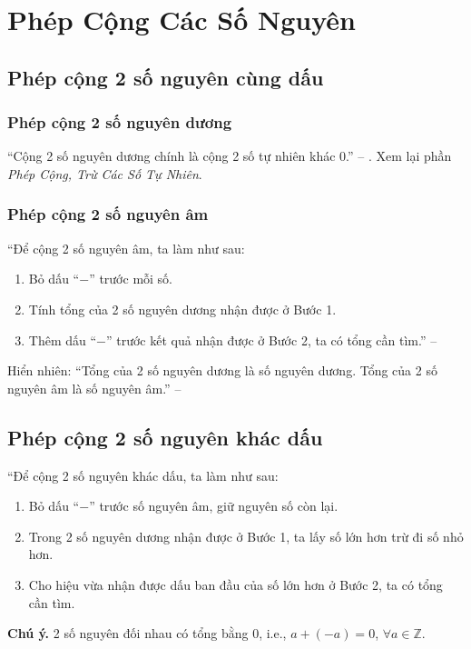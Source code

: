 \documentclass[oneside]{book}
\numberwithin{equation}{section}
\begin{document}

\section{Phép Cộng Các Số Nguyên}

\subsection{Phép cộng 2 số nguyên cùng dấu}

\subsubsection{Phép cộng 2 số nguyên dương}
``Cộng 2 số nguyên dương chính là cộng 2 số tự nhiên khác 0.'' -- \cite[p. 70]{Thai_Anh_Dat_Ha_Loan_Nam_Quang_Toan_6_tap_1}. Xem lại phần \textit{Phép Cộng, Trừ Các Số Tự Nhiên}.

\subsubsection{Phép cộng 2 số nguyên âm}
``Để cộng 2 số nguyên âm, ta làm như sau:
\begin{enumerate}
	\item Bỏ dấu ``$-$'' trước mỗi số.
	\item Tính tổng của 2 số nguyên dương nhận được ở Bước 1.
	\item Thêm dấu ``$-$'' trước kết quả nhận được ở Bước 2, ta có tổng cần tìm.'' -- \cite[p. 71]{Thai_Anh_Dat_Ha_Loan_Nam_Quang_Toan_6_tap_1}
\end{enumerate}
Hiển nhiên: ``Tổng của 2 số nguyên dương là số nguyên dương. Tổng của 2 số nguyên âm là số nguyên âm.'' -- \cite[p. 71]{Thai_Anh_Dat_Ha_Loan_Nam_Quang_Toan_6_tap_1}

\subsection{Phép cộng 2 số nguyên khác dấu}
``Để cộng 2 số nguyên khác dấu, ta làm như sau:
\begin{enumerate}
	\item Bỏ dấu ``$-$'' trước số nguyên âm, giữ nguyên số còn lại.
	\item Trong 2 số nguyên dương nhận được ở Bước 1, ta lấy số lớn hơn trừ đi số nhỏ hơn.
	\item Cho hiệu vừa nhận được dấu ban đầu của số lớn hơn ở Bước 2, ta có tổng cần tìm.
\end{enumerate}
\textbf{Chú ý.} 2 số nguyên đối nhau có tổng bằng 0, i.e., $a + (-a) = 0$, $\forall a\in\mathbb{Z}$.
\end{document}
